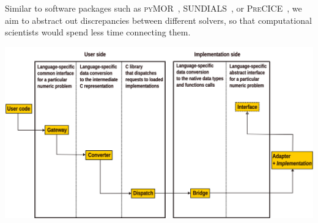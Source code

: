 \documentclass[a0paper, twocolumn, csc, english, final]{mpi2015_poster}
\begin{document}
\begin{poster}
\begin{pcolumn}
\begin{pbox}
      Similar to software packages such as \textsc{pyMOR}~\citep{Milk2016},
      \textsc{SUNDIALS}~\citep{GardnerEtAl2022},
      or \textsc{PreCICE}~\citep{Chourdakis2022},
      we aim to abstract out discrepancies between different solvers,
      so that computational scientists would spend less time connecting them.
    \end{pbox}

    \begin{pbox}
      \large
      \includegraphics[width=\columnwidth]{arch}


    \end{pbox}


\end{pcolumn}
\end{poster}
\end{document}

